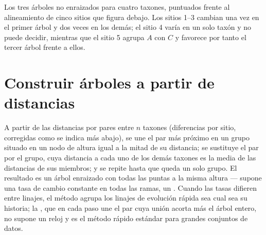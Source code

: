 \begin{omfigure}

{\small Los tres árboles no enraizados para cuatro taxones, puntuados frente
al alineamiento de cinco sitios que figura debajo. Los sitios 1--3 cambian
una vez en el primer árbol y dos veces en los demás; el sitio 4 varía en un solo
taxón y no puede decidir, mientras que el sitio 5 agrupa $A$ con $C$ y
favorece por tanto el tercer árbol frente a ellos.}
\end{omfigure}

\section{Construir árboles a partir de distancias}

\begin{method}\label{meth:b2:phylogenetic-trees:upgma}
A partir de las distancias por pares entre $n$ taxones (diferencias por
sitio, corregidas como se indica más abajo), se une el par más próximo en
un grupo situado en un nodo de altura igual a la mitad de su distancia; se
sustituye el par por el grupo, cuya distancia a cada uno de los demás
taxones es la media de las distancias de sus miembros; y se repite hasta
que queda un solo grupo. El resultado es un árbol enraizado con todas las
puntas a la misma altura --- supone una tasa de cambio constante en todas
las ramas, un . Cuando las tasas difieren entre linajes, el
método agrupa los linajes de evolución rápida sea cual sea su historia; la
\emph{},
que en cada paso une el par cuya unión acorta más el árbol entero, no
supone un reloj y es el método rápido estándar para grandes conjuntos de
datos.
\end{method}

